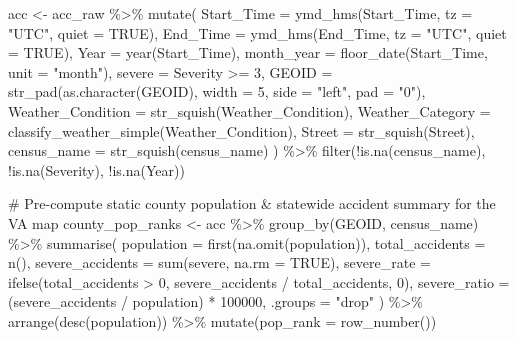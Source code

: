 \documentclass[
  letterpaper,
  DIV=11,
  numbers=noendperiod]{scrartcl}
\newenvironment{Shaded}{\begin{snugshade}}{\end{snugshade}}
\newcommand{\AttributeTok}[1]{\textcolor[rgb]{0.40,0.45,0.13}{#1}}
\newcommand{\CommentTok}[1]{\textcolor[rgb]{0.37,0.37,0.37}{#1}}
\newcommand{\ConstantTok}[1]{\textcolor[rgb]{0.56,0.35,0.01}{#1}}
\newcommand{\DecValTok}[1]{\textcolor[rgb]{0.68,0.00,0.00}{#1}}
\newcommand{\FunctionTok}[1]{\textcolor[rgb]{0.28,0.35,0.67}{#1}}
\newcommand{\NormalTok}[1]{\textcolor[rgb]{0.00,0.23,0.31}{#1}}
\newcommand{\OtherTok}[1]{\textcolor[rgb]{0.00,0.23,0.31}{#1}}
\newcommand{\SpecialCharTok}[1]{\textcolor[rgb]{0.37,0.37,0.37}{#1}}
\newcommand{\StringTok}[1]{\textcolor[rgb]{0.13,0.47,0.30}{#1}}
\begin{document}
\begin{Shaded}
\begin{Highlighting}[]
\NormalTok{acc }\OtherTok{\textless{}{-}}\NormalTok{ acc\_raw }\SpecialCharTok{\%\textgreater{}\%}
  \FunctionTok{mutate}\NormalTok{(}
    \AttributeTok{Start\_Time        =} \FunctionTok{ymd\_hms}\NormalTok{(Start\_Time, }\AttributeTok{tz =} \StringTok{"UTC"}\NormalTok{, }\AttributeTok{quiet =} \ConstantTok{TRUE}\NormalTok{),}
    \AttributeTok{End\_Time          =} \FunctionTok{ymd\_hms}\NormalTok{(End\_Time, }\AttributeTok{tz =} \StringTok{"UTC"}\NormalTok{, }\AttributeTok{quiet =} \ConstantTok{TRUE}\NormalTok{),}
    \AttributeTok{Year              =} \FunctionTok{year}\NormalTok{(Start\_Time),}
    \AttributeTok{month\_year        =} \FunctionTok{floor\_date}\NormalTok{(Start\_Time, }\AttributeTok{unit =} \StringTok{"month"}\NormalTok{),}
    \AttributeTok{severe            =}\NormalTok{ Severity }\SpecialCharTok{\textgreater{}=} \DecValTok{3}\NormalTok{,}
    \AttributeTok{GEOID             =} \FunctionTok{str\_pad}\NormalTok{(}\FunctionTok{as.character}\NormalTok{(GEOID), }\AttributeTok{width =} \DecValTok{5}\NormalTok{, }\AttributeTok{side =} \StringTok{"left"}\NormalTok{, }\AttributeTok{pad =} \StringTok{"0"}\NormalTok{),}
    \AttributeTok{Weather\_Condition =} \FunctionTok{str\_squish}\NormalTok{(Weather\_Condition),}
    \AttributeTok{Weather\_Category  =} \FunctionTok{classify\_weather\_simple}\NormalTok{(Weather\_Condition),}
    \AttributeTok{Street            =} \FunctionTok{str\_squish}\NormalTok{(Street),}
    \AttributeTok{census\_name       =} \FunctionTok{str\_squish}\NormalTok{(census\_name)}
\NormalTok{  ) }\SpecialCharTok{\%\textgreater{}\%}
  \FunctionTok{filter}\NormalTok{(}\SpecialCharTok{!}\FunctionTok{is.na}\NormalTok{(census\_name), }\SpecialCharTok{!}\FunctionTok{is.na}\NormalTok{(Severity), }\SpecialCharTok{!}\FunctionTok{is.na}\NormalTok{(Year))}

\CommentTok{\# Pre{-}compute static county population \& statewide accident summary for the VA map}
\NormalTok{county\_pop\_ranks }\OtherTok{\textless{}{-}}\NormalTok{ acc }\SpecialCharTok{\%\textgreater{}\%}
  \FunctionTok{group\_by}\NormalTok{(GEOID, census\_name) }\SpecialCharTok{\%\textgreater{}\%}
  \FunctionTok{summarise}\NormalTok{(}
    \AttributeTok{population       =} \FunctionTok{first}\NormalTok{(}\FunctionTok{na.omit}\NormalTok{(population)),}
    \AttributeTok{total\_accidents  =} \FunctionTok{n}\NormalTok{(),}
    \AttributeTok{severe\_accidents =} \FunctionTok{sum}\NormalTok{(severe, }\AttributeTok{na.rm =} \ConstantTok{TRUE}\NormalTok{),}
    \AttributeTok{severe\_rate      =} \FunctionTok{ifelse}\NormalTok{(total\_accidents }\SpecialCharTok{\textgreater{}} \DecValTok{0}\NormalTok{, severe\_accidents }\SpecialCharTok{/}\NormalTok{ total\_accidents, }\DecValTok{0}\NormalTok{),}
    \AttributeTok{severe\_ratio     =}\NormalTok{ (severe\_accidents }\SpecialCharTok{/}\NormalTok{ population) }\SpecialCharTok{*} \DecValTok{100000}\NormalTok{,}
    \AttributeTok{.groups =} \StringTok{"drop"}
\NormalTok{  ) }\SpecialCharTok{\%\textgreater{}\%}
  \FunctionTok{arrange}\NormalTok{(}\FunctionTok{desc}\NormalTok{(population)) }\SpecialCharTok{\%\textgreater{}\%}
  \FunctionTok{mutate}\NormalTok{(}\AttributeTok{pop\_rank =} \FunctionTok{row\_number}\NormalTok{())}


\end{Highlighting}
\end{Shaded}
\end{document}
